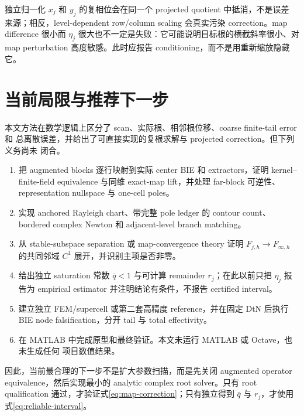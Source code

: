 \documentclass[UTF8,fontset=fandol,11pt,a4paper]{ctexart}
\begin{document}
独立归一化 $x_j$ 和 $y_j$ 的复相位会在同一个 projected quotient 中抵消，不是误差
来源；相反，level-dependent row/column scaling 会真实污染 correction。map difference
很小而 $\eta_j$ 很大也不一定是失败：它可能说明目标根的横截斜率很小、对 map
perturbation 高度敏感。此时应报告 conditioning，而不是用重新缩放隐藏它。

\section{当前局限与推荐下一步}

本文方法在数学逻辑上区分了 scan、实际根、相邻根位移、coarse finite-tail error 和
总离散误差，并给出了可直接实现的复根求解与 projected correction。但下列义务尚未
闭合。
\begin{enumerate}
  \item 把 augmented blocks 逐行映射到实际 center BIE 和 extractors，证明
  kernel--finite-field equivalence 与同维 exact-map lift，并处理 far-block 可逆性、
  representation nullspace 与 one-cell poles。
  \item 实现 anchored Rayleigh chart、带完整 pole ledger 的 contour count、bordered
  complex Newton 和 adjacent-level branch matching。
  \item 从 stable-subspace separation 或 map-convergence theory 证明
  $F_{j,h}\to F_{\infty,h}$ 的共同邻域 $C^1$ 展开，并识别主项是否非零。
  \item 给出独立 saturation 常数 $\bar q<1$ 与可计算 remainder $r_j$；在此以前只把
  $\eta_j$ 报告为 empirical estimator 并注明结论有条件，不报告 certified interval。
  \item 建立独立 FEM/supercell 或第二套高精度 reference，并在固定 DtN 后执行 BIE
  node falsification，分开 tail 与 total effectivity。
  \item 在 MATLAB 中完成原型和最终验证。本文未运行 MATLAB 或 Octave，也未生成任何
  项目数值结果。
\end{enumerate}

因此，当前最合理的下一步不是扩大参数扫描，而是先关闭 augmented operator
equivalence，然后实现最小的 analytic complex root solver。只有 root qualification
通过，才验证式\eqref{eq:map-correction}；只有独立得到 $\bar q$ 与 $r_j$，才使用
式\eqref{eq:reliable-interval}。
\end{document}
